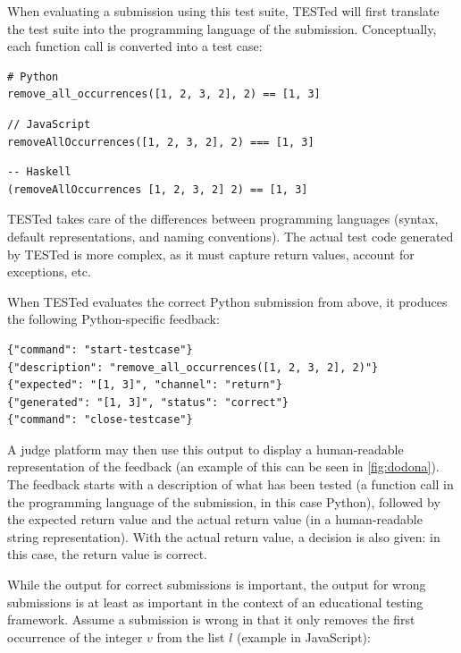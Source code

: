 \documentclass[../main]{subfiles}
\begin{document}
When evaluating a submission using this test suite, TESTed will first translate the test suite into the programming language of the submission.
Conceptually, each function call is converted into a test case:

\begin{verbatim}
# Python
remove_all_occurrences([1, 2, 3, 2], 2) == [1, 3]
\end{verbatim}

\begin{verbatim}
// JavaScript
removeAllOccurrences([1, 2, 3, 2], 2) === [1, 3]
\end{verbatim}

\begin{verbatim}
-- Haskell
(removeAllOccurrences [1, 2, 3, 2] 2) == [1, 3]
\end{verbatim}

TESTed takes care of the differences between programming languages (syntax, default representations, and naming conventions).
The actual test code generated by TESTed is more complex, as it must capture return values, account for exceptions, etc.

When TESTed evaluates the correct Python submission from above, it produces the following Python-specific feedback:

\begin{verbatim}
{"command": "start-testcase"}
{"description": "remove_all_occurrences([1, 2, 3, 2], 2)"}
{"expected": "[1, 3]", "channel": "return"}
{"generated": "[1, 3]", "status": "correct"}
{"command": "close-testcase"}
\end{verbatim}

A judge platform may then use this output to display a human-readable representation of the feedback (an example of this can be seen in \cref{fig:dodona}).
The feedback starts with a description of what has been tested (a function call in the programming language of the submission, in this case Python), followed by the expected return value and the actual return value (in a human-readable string representation).
With the actual return value, a decision is also given: in this case, the return value is correct.

While the output for correct submissions is important, the output for wrong submissions is at least as important in the context of an educational testing framework.
Assume a submission is wrong in that it only removes the first occurrence of the integer $v$ from the list $l$ (example in JavaScript):
\end{document}
